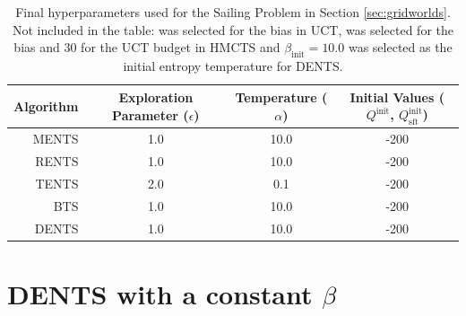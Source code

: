     \begin{table}[]
        \centering
        \begin{tabular}{r|ccc} 
            Algorithm   & Exploration Parameter ($\epsilon$)    & Temperature ($\alpha$)    & Initial Values ($Q^{\text{init}}$, $Q^{\text{init}}_{\text{sft}}$)    \\
            \hline
            MENTS       & 1.0                                   & 10.0                      & -200                                                                  \\
            RENTS       & 1.0                                   & 10.0                      & -200                                                                  \\
            TENTS       & 2.0                                   & 0.1                       & -200                                                                  \\
            BTS         & 1.0                                   & 10.0                      & -200                                                                  \\
            DENTS       & 1.0                                   & 10.0                      & -200                                                                  \\
        \end{tabular}
        \caption[Final hyperparameters used for the Sailing Problem in Section \ref{sec:gridworlds}]{Final hyperparameters used for the Sailing Problem in Section \ref{sec:gridworlds}. Not included in the table: %
        was selected for the bias in UCT, %
        was selected for the bias and 30 for the UCT budget in HMCTS and $\beta_{\text{init}}=10.0$ was selected as the initial entropy temperature for DENTS. \label{table:hyper_s}}
    \end{table}












\section{DENTS with a constant $\beta$} 
\label{appsec:dents_mimic_ments}


